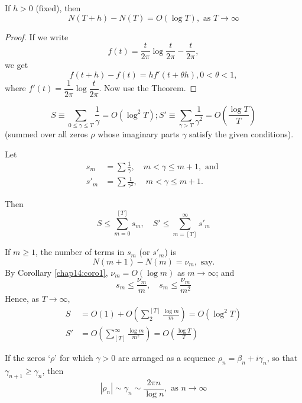 \setcounter{corollary}{0}
\begin{corollary}\label{chap14:coro1}
If $h>0$ (fixed), then 
$$
N(T +h) - N(T) = O (\log T), \text{ as } T \to \infty
$$
\end{corollary}

\begin{proof}
If we write
$$
f(t) = \frac{t}{2\pi} \log \frac{t}{2\pi} - \frac{t}{2\pi},
$$
we get
$$
f(t+h) - f(t) = h f'(t+\theta h), 0 < \theta < 1,
$$
where $f'(t) = \dfrac{1}{2\pi} \log \dfrac{t}{2\pi}$. Now use the Theorem.
\end{proof}

\begin{corollary}\label{chap14:coro2}
$$
S \equiv \sum\limits_{0 \leq \gamma \leq T} \frac{1}{\gamma} =
O(\log^2 T); S' \equiv \sum\limits_{\gamma >T} \frac{1}{\gamma^2} =
O \left(\frac{\log T}{T} \right)
$$
(summed over all zeros $\rho$ whose imaginary parts $\gamma$ satisfy
the given conditions).


Let\pageoriginale
\begin{align*}
s_m & = \sum \frac{1}{\gamma}, \quad m < \gamma \leq m+1, \text{ and }\\
s'_m & = \sum \frac{1}{\gamma^2},  \quad m < \gamma\leq m+1.
\end{align*}

Then
$$
S \leq \sum\limits^{[T]}_{m=0} s_m, \quad S' \leq \sum\limits^\infty_{m=[T]}
s'_m 
$$

If $m \geq 1$, the number of terms in $s_m$ (or $s'_m$) is 
$$
N(m+1) - N (m) = \nu_m, \text{ say}.
$$
By Corollary \ref{chap14:coro1}, $\nu_m =O(\log m)$ as $m \to \infty$; and 
$$
s_m \leq \frac{\nu_m}{m}, \quad s_m \leq \frac{\nu_m}{m^2}
$$
Hence, as $T \to \infty$,
\begin{align*}
S & = O(1) + O \left( \sum^{[T]}_{2} \frac{\log m}{m}\right) =
O(\log^2 T)\\
S' & = O \left(\sum\limits^\infty_{[T]} \frac{\log m}{m^2} \right) = O
\left(\frac{\log T}{T} \right)
 \end{align*}
\end{corollary}

\begin{corollary}\label{chap14:coro3}
If the zeros `$\rho$' for which $\gamma >0$ are arranged as a sequence
$\rho_n = \beta_n + i \gamma_n$, so that $\gamma_{n+1} \geq \gamma_n$,
then 
$$
|\rho_n| \sim \gamma_n \sim \frac{2\pi n}{\log n} , \text{ as } n \to
\infty 
$$
\end{corollary}

